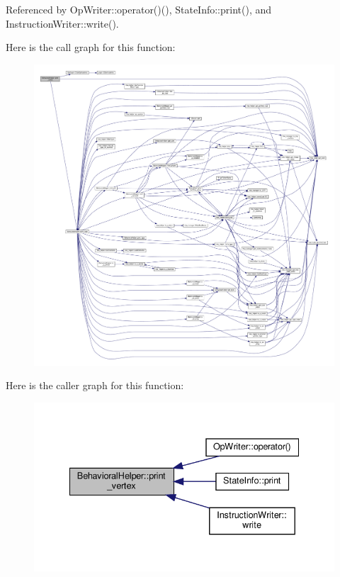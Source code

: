 Referenced by Op\+Writer\+::operator()(), State\+Info\+::print(), and Instruction\+Writer\+::write().

Here is the call graph for this function\+:
\nopagebreak
\begin{figure}[H]
\begin{center}
\leavevmode
\includegraphics[width=350pt]{dd/db2/classBehavioralHelper_ac4cf5e71318df6a6adf0685540cbb22b_cgraph}
\end{center}
\end{figure}
Here is the caller graph for this function\+:
\nopagebreak
\begin{figure}[H]
\begin{center}
\leavevmode
\includegraphics[width=335pt]{dd/db2/classBehavioralHelper_ac4cf5e71318df6a6adf0685540cbb22b_icgraph}
\end{center}
\end{figure}
\mbox{\label{classBehavioralHelper_a615ea10adbdd1adaefb26e4f622c0ec7}} 
